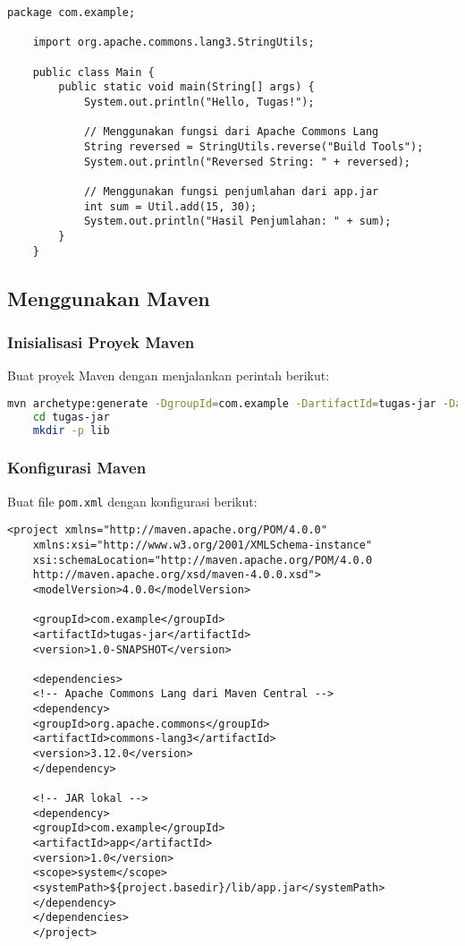 \begin{lstlisting}[style=JavaStyle]
	package com.example;
	
	import org.apache.commons.lang3.StringUtils;
	
	public class Main {
		public static void main(String[] args) {
			System.out.println("Hello, Tugas!");
			
			// Menggunakan fungsi dari Apache Commons Lang
			String reversed = StringUtils.reverse("Build Tools");
			System.out.println("Reversed String: " + reversed);
			
			// Menggunakan fungsi penjumlahan dari app.jar
			int sum = Util.add(15, 30);
			System.out.println("Hasil Penjumlahan: " + sum);
		}
	}
\end{lstlisting}

\subsection{Menggunakan Maven}
\subsubsection{Inisialisasi Proyek Maven}
Buat proyek Maven dengan menjalankan perintah berikut:

\begin{lstlisting}[language=bash]
	mvn archetype:generate -DgroupId=com.example -DartifactId=tugas-jar -DarchetypeArtifactId=maven-archetype-quickstart -DinteractiveMode=false
	cd tugas-jar
	mkdir -p lib
\end{lstlisting}

\subsubsection{Konfigurasi Maven}
Buat file \texttt{pom.xml} dengan konfigurasi berikut:

\begin{lstlisting}[style=XmlStyle]
	<project xmlns="http://maven.apache.org/POM/4.0.0"
	xmlns:xsi="http://www.w3.org/2001/XMLSchema-instance"
	xsi:schemaLocation="http://maven.apache.org/POM/4.0.0
	http://maven.apache.org/xsd/maven-4.0.0.xsd">
	<modelVersion>4.0.0</modelVersion>
	
	<groupId>com.example</groupId>
	<artifactId>tugas-jar</artifactId>
	<version>1.0-SNAPSHOT</version>
	
	<dependencies>
	<!-- Apache Commons Lang dari Maven Central -->
	<dependency>
	<groupId>org.apache.commons</groupId>
	<artifactId>commons-lang3</artifactId>
	<version>3.12.0</version>
	</dependency>
	
	<!-- JAR lokal -->
	<dependency>
	<groupId>com.example</groupId>
	<artifactId>app</artifactId>
	<version>1.0</version>
	<scope>system</scope>
	<systemPath>${project.basedir}/lib/app.jar</systemPath>
	</dependency>
	</dependencies>
	</project>
\end{lstlisting}

